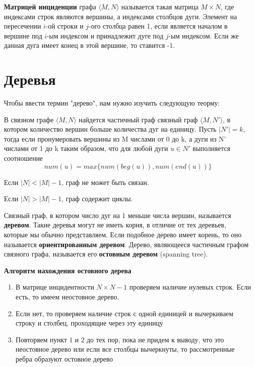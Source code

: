 \textbf{Матрицей инциденции} графа $\langle M, N\rangle$ называется такая матрица $M \times N$, 
где индексами строк являются вершины, а индексами столбцов дуги. Элемент на пересечении $i$-ой строки и $j$-ого
столбца равен 1, если является началом в вершине под $i$-ым индексом и принадлежит дуге под $j$-ым индексом. Если же данная
дуга имеет конец в этой вершине, то ставится -1.

\section{Деревья}
Чтобы ввести термин "дерево", нам нужно изучить следующую теорму:
\begin{thm}
    В связном графе $\langle M, N \rangle$ найдется частичный граф связный граф
    $\langle M, N' \rangle$, в котором количество вершин больше количества дуг на единицу. Пусть $|N'| = k$, 
    тогда если пронумеровать вершины из M числами от 0 до k, а дуги из N' числами от 1 до k
    таким образом, что для любой дуги $u \in N'$ выполняется соотношение
    \begin{equation}
        num(u) = max\{num(beg(u)), num(end(u))\}
    \end{equation}
\end{thm}
\begin{sle}
    Если $|N| < |M| - 1$, граф не может быть связан.
\end{sle}
\begin{sle}
    Если $|N| > |M| - 1$, граф содержит циклы.
\end{sle}

Связный граф, в котором число дуг на 1 меньше числа вершин, называется
\textbf{деревом}. Такие деревья могут не иметь корня, в отличие от тех деревьев,
которые мы обычно представляем. Если подобное дерево имеет корень, то оно называется 
\textbf{ориентированным деревом}.
Дерево, являющееся частичным графом связного графа, называется его \textbf{остовным деревом} (spanning tree).

\hspace{3mm}

\textbf{Алгоритм нахождения остовного дерева}
\begin{enumerate}
    \item В матрице инцидентности $N \times N-1$ проверяем наличие нулевых строк. 
    Если есть, то имеем неостовное дерево.
    \item Если нет, то проверяем наличие строк с одной единицей
    и вычеркиваем строку и столбец, проходящие через эту единицу
    \item Повторяем пункт 1 и 2 до тех пор, пока не придем к выводу, что это неостовное дерево или
    если все столбцы вычеркнуты, то рассмотренные ребра образуют остовное дерево
\end{enumerate}

